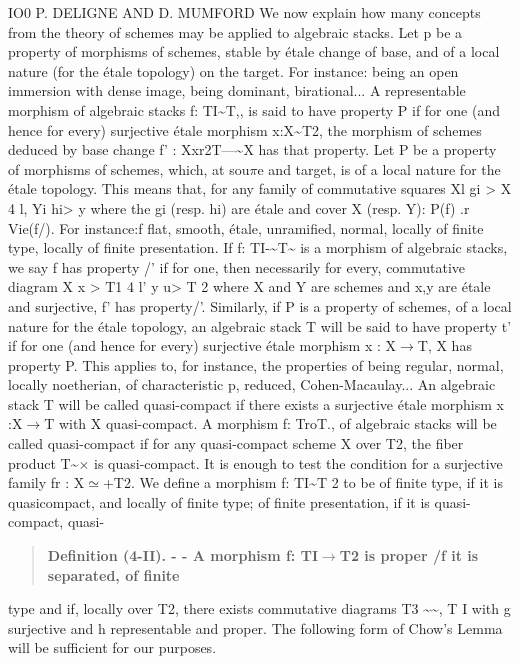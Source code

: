 \documentclass[11pt]{article}
\theoremstyle{plain}
\theoremstyle{definition}
\theoremstyle{remark}
\begin{document}
IO0 P. DELIGNE AND D. MUMFORD We now explain how many concepts from the theory of schemes may be applied to algebraic stacks. Let p be a property of morphisms of schemes, stable by \'etale change of base, and of a local nature (for the \'etale topology) on the target. For instance: being an open immersion with dense image, being dominant, birational... A representable morphism of algebraic stacks f: TI\textasciitilde{}T,, is said to have property P if for one (and hence for every) surjective \'etale morphism x:X\textasciitilde{}T2, the morphism of schemes deduced by base change f' : Xxr2T---\textasciitilde{}X has that property. Let P be a property of morphisms of schemes, which, at sou$\pi$e and target, is of a local nature for the \'etale topology. This means that, for any family of commutative squares Xl gi > X 4 l, Yi hi> y where the gi (resp. hi) are \'etale and cover X (resp. Y): P(f) .r Vie(f/). For instance:f flat, smooth, \'etale, unramified, normal, locally of finite type, locally of finite presentation. If f: TI-\textasciitilde{}T\textasciitilde{} is a morphism of algebraic stacks, we say f has property /' if for one, then necessarily for every, commutative diagram X x > T1 4 l' y u> T 2 where X and Y are schemes and x,y are \'etale and surjective, f' has property/'. Similarly, if P is a property of schemes, of a local nature for the \'etale topology, an algebraic stack T will be said to have property t' if for one (and hence for every) surjective \'etale morphism x : X$\to$T, X has property P. This applies to, for instance, the properties of being regular, normal, locally noetherian, of characteristic p, reduced, Cohen-Macaulay... An algebraic stack T will be called quasi-compact if there exists a surjective \'etale morphism x :X$\to$T with X quasi-compact. A morphism f: TroT., of algebraic stacks will be called quasi-compact if for any quasi-compact scheme X over T2, the fiber product T\textasciitilde{}$\times$ is quasi-compact. It is enough to test the condition for a surjective family fr : X$\simeq$+T2. We define a morphism f: TI\textasciitilde{}T 2 to be of finite type, if it is quasicompact, and locally of finite type; of finite presentation, if it is quasi-compact, quasi-

\begin{quote}\textbf{Definition (4-II). - - A morphism f: TI$\to$T2 is proper /f it is separated, of finite}\end{quote}
type and if, locally over T2, there exists commutative diagrams T3 \textasciitilde{}\textasciitilde{}, T I with g surjective and h representable and proper. The following form of Chow's Lemma will be sufficient for our purposes.
\end{document}
